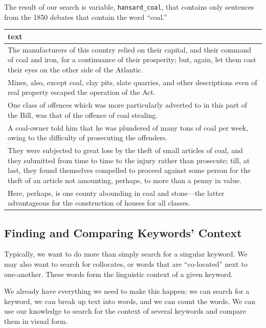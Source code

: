\documentclass[
]{article}
\begin{document}
The result of our search is variable, \texttt{hansard\_coal}, that
contains only sentences from the 1850 debates that contain the word
``coal.''

\begin{longtable}{>{\raggedright\arraybackslash}p{14cm}}
\toprule
text\\
\midrule
The manufacturers of this country relied on their capital, and their command of
coal and iron, for a continuance of their prosperity; but, again, let them cast
their eyes on the other side of the Atlantic.\\
Mines, also, except coal, clay pits, slate quarries, and other descriptions even
of real property escaped the operation of the Act.\\
One class of offences which was more particularly adverted to in this part of
the Bill, was that of the offence of coal stealing.\\
A coal-owner told him that he was plundered of many tons of coal per week, owing
to the difficulty of prosecuting the offenders.\\
They were subjected to great loss by the theft of small articles of coal, and
they submitted from time to time to the injury rather than prosecute; till, at
last, they found themselves compelled to proceed against some person for the
theft of an article not amounting, perhaps, to more than a penny in value.\\
\addlinespace
Here, perhaps, is one county abounding in coal and stone—the latter advantageous
for the construction of houses for all classes.\\
\bottomrule
\end{longtable}

\subsection{Finding and Comparing Keywords'
Context}\label{finding-and-comparing-keywords-context}

Typically, we want to do more than simply search for a singular keyword.
We may also want to search for collocates, or words that are
``co-located'' next to one-another. These words form the linguistic
context of a given keyword.

We already have everything we need to make this happen: we can search
for a keyword, we can break up text into words, and we can count the
words. We can use our knowledge to search for the context of several
keywords and compare them in visual form.
\end{document}
